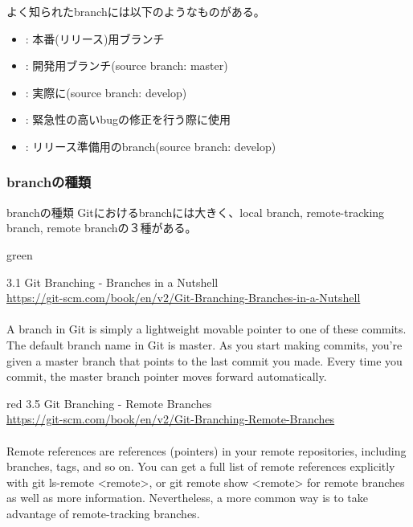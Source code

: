 \documentclass[11pt,a4paper,openany,dvipdfmx]{jsarticle}
\begin{document}
よく知られたbranchには以下のようなものがある。
\begin{tcolorbox}[colframe=Cyan]
    \begin{itemize}
        \item {}: 本番(リリース)用ブランチ
        \item {}: 開発用ブランチ(source branch: master)
        \item {}: 実際に(source branch: develop)
        \item {}: 緊急性の高いbugの修正を行う際に使用
        \item {}: リリース準備用のbranch(source branch: develop)
    \end{itemize}
\end{tcolorbox}

\subsubsection{branchの種類} %
\label{ssub:branchの種類}

\begin{oceanbox}{branchの種類}
Gitにおけるbranchには大きく、local branch, remote-tracking branch, remote branchの３種がある。
\end{oceanbox}


\begin{ColorReferenceBox}{green}

3.1 Git Branching - Branches in a Nutshell\\
\url{https://git-scm.com/book/en/v2/Git-Branching-Branches-in-a-Nutshell}\\
\\
A branch in Git is simply a lightweight movable pointer to one of these commits. The default branch name in Git is master. As you start making commits, you’re given a master branch that points to the last commit you made. Every time you commit, the master branch pointer moves forward automatically.

\end{ColorReferenceBox}


\begin{ColorReferenceBox}{red}
3.5 Git Branching - Remote Branches\\
\url{https://git-scm.com/book/en/v2/Git-Branching-Remote-Branches}\\
\\
Remote references are references (pointers) in your remote repositories, including branches, tags, and so on. You can get a full list of remote references explicitly with git ls-remote <remote>, or git remote show <remote> for remote branches as well as more information. Nevertheless, a more common way is to take advantage of remote-tracking branches.

\end{ColorReferenceBox}
\end{document}
